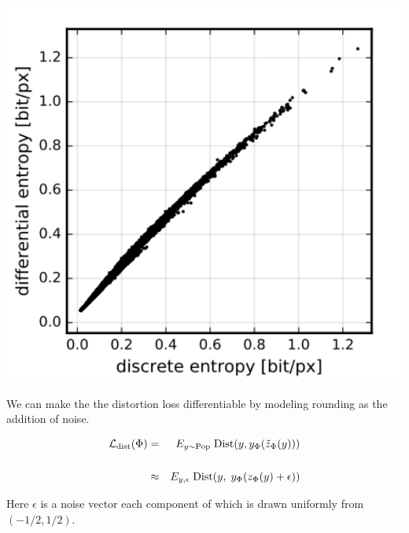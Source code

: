 {\bigskip
\centerline{\includegraphics[height=5in]{../images/RateDist6}}


We can make the the distortion loss differentiable by modeling rounding as the addition of noise.

\begin{eqnarray*}
{\cal L}_{\mathrm{dist}}(\Phi) & = & E_{y \sim \mathrm{Pop}} \;\mathrm{Dist}(y,y_\Phi(\tilde{z}_\Phi(y))) \\
\\
& \approx & E_{y,\epsilon} \;\mathrm{Dist}(y,\;y_\Phi(z_\Phi(y) + \epsilon))
\end{eqnarray*}

\vfill
Here $\epsilon$ is a noise vector each component of which is drawn uniformly from $(-1/2,1/2)$.


}
